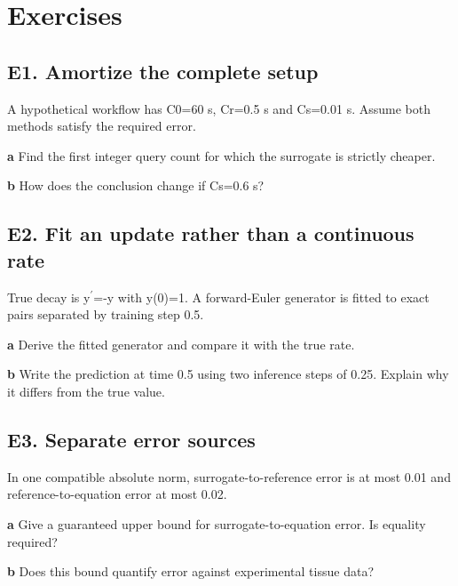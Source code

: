 \documentclass[11pt,letterpaper]{article}
\theoremstyle{definition}\newtheorem{definition}{Definition}\newtheorem{example}{Example}
\numberwithin{equation}{section}
\begin{document}
\section*{Exercises}
\par\noindent\begin{minipage}{\linewidth}
\subsection*{E1. Amortize the complete setup}
A hypothetical workflow has C0=\allowbreak{}60 s, Cr=\allowbreak{}0.5 s and Cs=\allowbreak{}0.01 s. Assume both methods satisfy the required error.

\textbf{a} Find the first integer query count for which the surrogate is strictly cheaper.

\end{minipage}\par\medskip
\textbf{b} How does the conclusion change if Cs=\allowbreak{}0.6 s?

\par\noindent\begin{minipage}{\linewidth}
\subsection*{E2. Fit an update rather than a continuous rate}
True decay is y$^{\prime}$=\allowbreak{}-y with y(0)=\allowbreak{}1. A forward-Euler generator is fitted to exact pairs separated by training step 0.5.

\textbf{a} Derive the fitted generator and compare it with the true rate.

\end{minipage}\par\medskip
\textbf{b} Write the prediction at time 0.5 using two inference steps of 0.25. Explain why it differs from the true value.

\par\noindent\begin{minipage}{\linewidth}
\subsection*{E3. Separate error sources}
In one compatible absolute norm, surrogate-to-reference error is at most 0.01 and reference-to-equation error at most 0.02.

\textbf{a} Give a guaranteed upper bound for surrogate-to-equation error. Is equality required?

\end{minipage}\par\medskip
\textbf{b} Does this bound quantify error against experimental tissue data?
\end{document}
